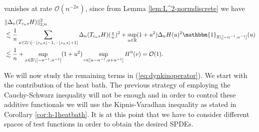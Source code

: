\documentclass[a4paper, reqno, 12pt]{amsart}
\theoremstyle{plain}
\theoremstyle{definition}
\newcommand{\floor}[1]{\left\lfloor #1 \right\rfloor}
\newcommand{\R}{\mathbb{R}}
\newcommand{\Z}{\mathbb{Z}}
\begin{document}
vanishes at rate $\mathcal{O}\left(  n^{-2\kappa} \right) $, since from Lemma \ref{lem:L^2-normdiscrete} we have
\begin{equation} \label{eq:discreteL2discontinuity}
\begin{split}
    &\|\Delta_n (T_{c_ns}H) \|_{2,n}^2\\ &\lesssim \frac{1}{n}\sum_{x\in\Z\cap[-\floor{c_ns}-1,-\floor{c_ns}+1]} \Delta_n (T_{c_ns}H)(\tfrac{x}{n})^2 +\sup_{u\in\R} (1+u^2) \Delta_n H(u)^2\mathbbm{1}_{\R\setminus[-n^{-1},n^{-1}]}(u) \\
    & \lesssim \frac{1}{n} + \sup_{x\in\R\setminus[-n^{-1},n^{-1}]} (1+ u^2)\sup_{v\in[u-n^{-1},u+n^{-1}]} H''(v) = \mathcal{O}(1).
\end{split}
\end{equation}

We will now study the remaining terms in (\ref{eq:dynkinoperator}). We start with the contribution of the  heat bath. The previous strategy of employing the Cauchy-Schwarz inequality will not be enough and in order to control these additive functionals we will use the  Kipnis-Varadhan inequality as stated in  Corollary \ref{cor:h-1heatbath}. It is at this point that we have to consider different spaces of test functions in order to obtain the desired SPDEs.
\end{document}
